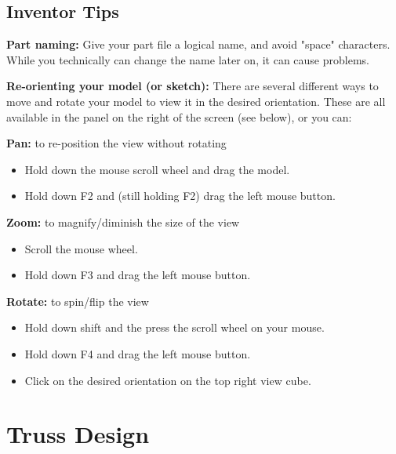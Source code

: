 \documentclass[12pt]{article}
\begin{document}
\subsection{Inventor Tips}
\begin{theorem*}
  \textbf{Part naming:} Give your part file a logical name, and avoid "space" characters. While you technically can change the name later on, it can cause problems.

  \textbf{Re-orienting your model (or sketch):} There are several different ways to move and rotate your model to view it in the desired orientation. These are all available in the panel on the right of the screen (see below), or you can:  

  \textbf{Pan:} to re-position the view without rotating 

  \begin{itemize}
    \item Hold down the mouse scroll wheel and drag the model.
    \item Hold down F2 and (still holding F2) drag the left mouse button.
  \end{itemize}

  \textbf{Zoom:} to magnify/diminish the size of the view

  \begin{itemize}
    \item Scroll the mouse wheel.
    \item Hold down F3 and drag the left mouse button.
  \end{itemize}

  \textbf{Rotate:} to spin/flip the view
  \begin{itemize}
    \item Hold down shift and the press the scroll wheel on your mouse.
    \item Hold down F4 and drag the left mouse button.
    \item Click on the desired orientation on the top right view cube.
  \end{itemize}
\end{theorem*}

\section{Truss Design}
\end{document}
